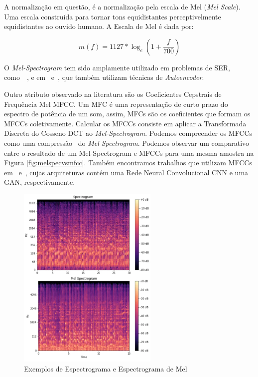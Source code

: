 A normalização em questão, é a normalização pela escala de Mel (\textit{Mel Scale}). Uma escala construída para tornar tons equidistantes perceptivelmente equidistantes ao ouvido humano. A Escala de Mel é dada por:

\begin{equation}
    m(f) = 1127 * \log_e{(1 + \frac{f}{700})}
\end{equation}

O \textit{Mel-Spectrogram} tem sido amplamente utilizado em problemas de \acrshort{SER}, como~\cite{32.25}~\cite{32.30}, e em~\cite{32.31} e~\cite{32.32}, que também utilizam técnicas de \textit{Autoencoder}.

Outro atributo observado na literatura são os Coeficientes Cepstrais de Frequência Mel \acrlong{MFCC}. Um \acrlong{MFC} é uma representação de curto prazo do espectro de potência de um som, assim, \acrshort{MFC}s são os coeficientes que formam os \acrshort{MFCC}s coletivamente. Calcular os \acrshort{MFCC}s consiste em aplicar a Transformada Discreta do Cosseno \acrlong{DCT} ao \textit{Mel-Spectrogram}. Podemos compreender os \acrshort{MFCC}s como uma compressão~\cite{64} do \textit{Mel Spectrogram}. Podemos observar um comparativo entre o resultado de um Mel-Spectrogram e \acrshort{MFCC}s para uma mesma amostra na Figura \ref{fig:melspecvsmfcc}. Também encontramos trabalhos que utilizam \acrshort{MFCC}s em~\cite{32.79} e~\cite{32.89}, cujas arquiteturas contém uma Rede Neural Convolucional \acrlong{CNN} e uma \acrshort{GAN}, respectivamente.

\begin{figure}[]
\centering
\includegraphics[width=0.6\textwidth]{img/espectrograma-vs-mel-espectrograma.png}
\caption{\label{fig:specvsmelespectrograma}Exemplos de Espectrograma e Espectrograma de Mel}
\end{figure}


